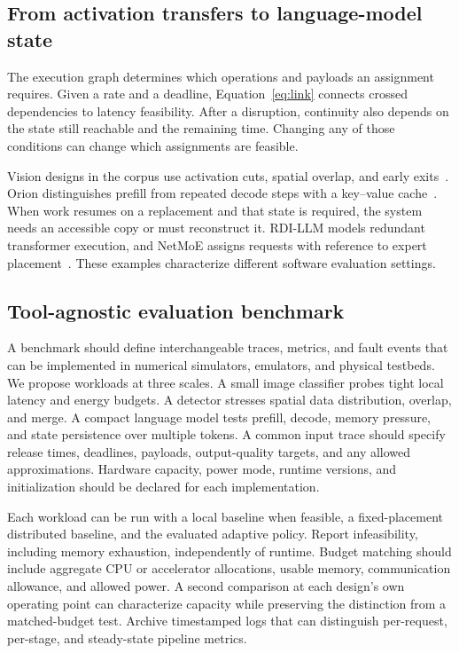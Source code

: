 \documentclass[pdflatex,sn-vancouver-num]{sn-jnl}
\begin{document}
\subsection{From activation transfers to language-model state}
The execution graph determines which operations and payloads an assignment requires. Given a rate and a deadline, Equation~\ref{eq:link} connects crossed dependencies to latency feasibility. After a disruption, continuity also depends on the state still reachable and the remaining time. Changing any of those conditions can change which assignments are feasible.

Vision designs in the corpus use activation cuts, spatial overlap, and early exits~\cite{R0010,R0014,R0075}. Orion distinguishes prefill from repeated decode steps with a key--value cache~\cite{R0074}. When work resumes on a replacement and that state is required, the system needs an accessible copy or must reconstruct it. RDI-LLM models redundant transformer execution, and NetMoE assigns requests with reference to expert placement~\cite{R0110,R0118}. These examples characterize different software evaluation settings.

\subsection{Tool-agnostic evaluation benchmark}
A benchmark should define interchangeable traces, metrics, and fault events that can be implemented in numerical simulators, emulators, and physical testbeds. We propose workloads at three scales. A small image classifier probes tight local latency and energy budgets. A detector stresses spatial data distribution, overlap, and merge. A compact language model tests prefill, decode, memory pressure, and state persistence over multiple tokens. A common input trace should specify release times, deadlines, payloads, output-quality targets, and any allowed approximations. Hardware capacity, power mode, runtime versions, and initialization should be declared for each implementation.

Each workload can be run with a local baseline when feasible, a fixed-placement distributed baseline, and the evaluated adaptive policy. Report infeasibility, including memory exhaustion, independently of runtime. Budget matching should include aggregate CPU or accelerator allocations, usable memory, communication allowance, and allowed power. A second comparison at each design's own operating point can characterize capacity while preserving the distinction from a matched-budget test. Archive timestamped logs that can distinguish per-request, per-stage, and steady-state pipeline metrics.
\end{document}
